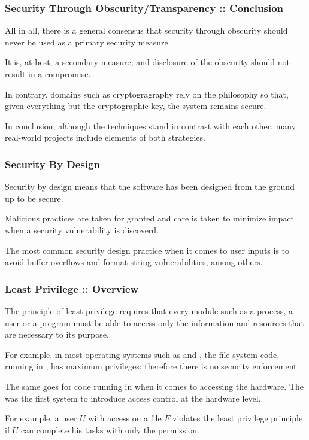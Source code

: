 \begin{frame}
  \frametitle{Security Through Obscurity/Transparency :: Conclusion}

  All in all, there is a general consensus that security through obscurity
  should never be used as a primary security measure.

  \-

  It is, at best, a secondary measure; and disclosure of the obscurity should
  not result in a compromise.

  \-

  In contrary, domains such as cryptogragraphy rely on the
   philosophy so that, given everything but the
  cryptographic key, the system remains secure.

  \-

  In conclusion, although the techniques stand in contrast with each other,
  many real-world projects include elements of both strategies.
\end{frame}


\begin{frame}
  \frametitle{Security By Design}

  Security by design means that the software has been designed from the ground
  up to be secure.

  \-

  Malicious practices are taken for granted and care is taken to minimize
  impact when a security vulnerability is discoverd.

  \-

  The most common security design practice when it comes to user inputs is
  to avoid buffer overflows and format string vulnerabilities, among others.
\end{frame}


\begin{frame}
  \frametitle{Least Privilege :: Overview}

  The principle of least privilege requires that every module such as a
  process, a user or a program must be able to access only the information
  and resources that are necessary to its purpose.

  \-

  For example, in most operating systems such as  and
  , the file system code, running in , has
  maximum privileges; therefore there is no security enforcement.

  \-

  The same goes for code running in  when it comes to
  accessing the hardware. The  was the first system
  to introduce access control at the hardware level.

  \-

  For example, a user $U$ with  access on a file
  $F$ violates the least privilege principle if $U$ can complete his
  tasks with only the  permission.
\end{frame}

